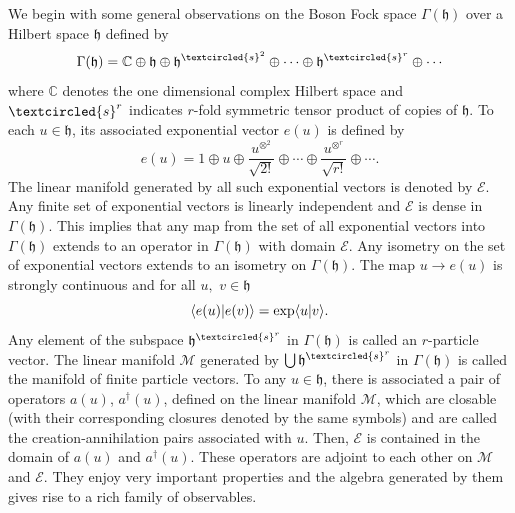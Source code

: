 We begin with some general observations on the Boson Fock space $\Gamma(\mathfrak{h})$ over a Hilbert space $\mathfrak{h}$ defined by 
\begin{equation}
\Gamma(\mathfrak{h})=\mathbb{C}\oplus \mathfrak{h} \oplus \mathfrak{h}^{\textcircled{s}^2} \oplus \cdots \oplus \mathfrak{h}^{\textcircled{s}^r}\oplus \cdots  \label{chap3-eq3.1}
\end{equation} 
where $\mathbb{C}$ denotes the one dimensional complex Hilbert space and  $\textcircled{s}^r$ indicates $r$-fold symmetric tensor product of copies of $\mathfrak{h}$. To each $u\in \mathfrak{h}$, its associated exponential vector $e(u)$ is defined by 
\begin{equation} 
e (u) = 1 \oplus u \oplus \frac{u^{\otimes^{2}}}{\sqrt{2!}}  \oplus \cdots \oplus \frac{u^{\otimes^{r}}}{\sqrt{r!}}  \oplus \cdots.\label{chap5-eq3.2}
\end{equation}
The linear manifold generated by all such exponential vectors is denoted by $\mathcal{E}$. Any finite set of exponential vectors is linearly independent and $\mathcal{E}$ is dense in $\Gamma(\mathfrak{h})$. This implies that any map from the set of all exponential vectors into 
$\Gamma(\mathfrak{h})$ extends to an operator in $\Gamma(\mathfrak{h})$ with domain $\mathcal{E}$. 
Any isometry on the set of exponential vectors extends to an isometry on $\Gamma(\mathfrak{h})$. The map $u\rightarrow e(u)$ is strongly continuous and for all $u,\,\, v\in \mathfrak{h}$ 
\begin{equation}
\langle e(u)\vert e(v)\rangle = {\rm exp}\langle u\vert v\rangle . \label{chap5-eq3.3}
\end{equation}
Any element of the subspace $\mathfrak{h}^{\textcircled{s}^r}$ in $\Gamma(\mathfrak{h})$ is called an $r$-particle vector. 
The linear manifold $\mathcal{M}$ generated by $\bigcup \mathfrak{h}^{\textcircled{s}^r}$ in  $\Gamma(\mathfrak{h})$ is called the manifold of finite particle vectors. To any $u\in \mathfrak{h}$, there is associated a pair of operators $a(u)$, $a^\dag(u)$, defined on the linear manifold $\mathcal{M}$, which are closable (with their corresponding closures denoted by the same symbols) and  are called the creation-annihilation pairs associated with $u$. Then, $\mathcal{E}$ is contained in the domain of $a(u)$ and $a^\dag(u)$. These operators  are adjoint to each other on $\mathcal{M}$ and $\mathcal{E}$. They enjoy very important properties and the algebra generated by them gives rise to a rich family of observables. 

